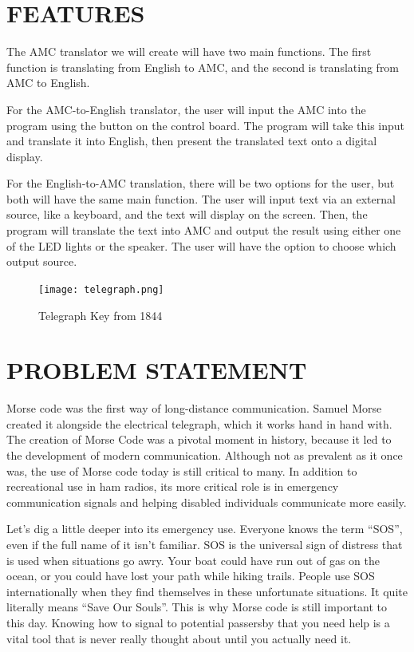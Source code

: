 \documentclass[12pt]{article}
\begin{document}
	
	\section{FEATURES}
	The AMC translator we will create will have two main functions. The first function is translating from English to AMC, and the second is translating from AMC to English. 
	
	For the AMC-to-English translator, the user will input the AMC into the program using the button on the control board. The program will take this input and translate it into English, then present the translated text onto a digital display.
	
	For the English-to-AMC translation, there will be two options for the user, but both will have the same main function. The user will input text via an external source, like a keyboard, and the text will display on the screen. Then, the program will translate the text into AMC and output the result using either one of the LED lights or the speaker. The user will have the option to choose which output source.
	
	
	
	\begin{figure}[!t]
		\centering
		\texttt{[image: telegraph.png]}
		\caption{Telegraph Key from 1844}
		\label{fig:cpx}
	\end{figure}
	
	\section{PROBLEM STATEMENT}
	Morse code was the first way of long-distance communication. Samuel Morse created it alongside the electrical telegraph, which it works hand in hand with. The creation of Morse Code was a pivotal moment in history, because it led to the development of modern communication. Although not as prevalent as it once was, the use of Morse code today is still critical to many. In addition to recreational use in ham radios, its more critical role is in emergency communication signals and helping disabled individuals communicate more easily.
	
	Let’s dig a little deeper into its emergency use. Everyone knows the term “SOS”, even if the full name of it isn’t familiar. SOS is the universal sign of distress that is used when situations go awry. Your boat could have run out of gas on the ocean, or you could have lost your path while hiking trails. People use SOS internationally when they find themselves in these unfortunate situations. It quite literally means “Save Our Souls”. This is why Morse code is still important to this day. Knowing how to signal to potential passersby that you need help is a vital tool that is never really thought about until you actually need it.
	
\end{document}
